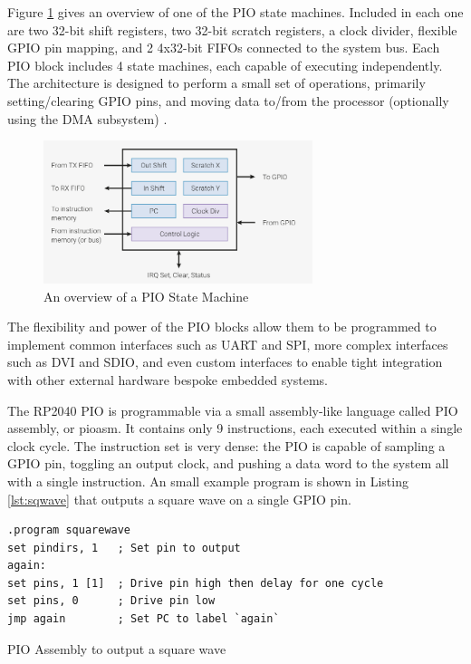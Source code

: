 Figure \ref{fig:pio-sm} gives an overview of one of the PIO state machines. Included in each one are two 32-bit shift registers, two 32-bit scratch registers, a clock divider, flexible GPIO pin mapping, and 2 4x32-bit FIFOs connected to the system bus. Each PIO block includes 4 state machines, each capable of executing independently. The architecture is designed to perform a small set of operations, primarily setting/clearing GPIO pins, and moving data to/from the processor (optionally using the DMA subsystem) \cite{rp2040}.

\begin{figure}[H]
    \centering
    \includegraphics[width=0.7\textwidth]{../img/rp2040-state-machine.png}
    \caption{An overview of a PIO State Machine \citep{rp2040}}
    \label{fig:pio-sm}
\end{figure}

The flexibility and power of the PIO blocks allow them to be programmed to implement common interfaces such as UART and SPI, more complex interfaces such as DVI and SDIO, and even custom interfaces to enable tight integration with other external hardware bespoke embedded systems.

The RP2040 PIO is programmable via a small assembly-like language called PIO assembly, or pioasm. It contains only 9 instructions, each executed within a single clock cycle. The instruction set is very dense: the PIO is capable of sampling a GPIO pin, toggling an output clock, and pushing a data word to the system all with a single instruction. An small example program is shown in Listing \ref{lst:sqwave} that outputs a square wave on a single GPIO pin.

\begin{listing}[b]
    \vspace{0.5cm}
    \begin{verbatim}
.program squarewave
set pindirs, 1   ; Set pin to output
again:
set pins, 1 [1]  ; Drive pin high then delay for one cycle
set pins, 0      ; Drive pin low
jmp again        ; Set PC to label `again`
    \end{verbatim}
    \caption{PIO Assembly to output a square wave \citep{rp2040}}
    \label{lst:sqwave}
\end{listing}

